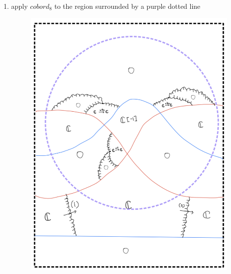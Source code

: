\begin{enumerate}[label = (\roman*)]
\begin{enumerate}[label = (Step \arabic*)]
\item apply $cobord_8$ to the region surrounded by a purple dotted line
\begin{figure}[H]
    \centering
    \includegraphics[scale = 0.95]{diagrams/cobord_gen/base_5.png}
    \caption{}
    \label{fig:your-label}
\end{figure}


\end{enumerate}
\end{enumerate}

